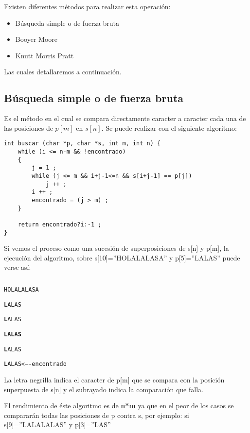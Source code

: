 Existen diferentes métodos para realizar esta operación:
\begin{itemize}
\item Búsqueda simple o de fuerza bruta
\item Booyer Moore
\item Knutt Morris Pratt
\end{itemize}
Las cuales detallaremos a continuación.

\subsection{Búsqueda simple o de fuerza bruta}
\label{sec:busqueda-simple-o}

Es el método en el cual se compara directamente caracter a caracter
cada una de las posiciones de $p[m]$ en $s[n]$.  Se puede realizar con
el siguiente algoritmo:

\begin{verbatim}
int buscar (char *p, char *s, int m, int n) {
    while (i <= n-m && !encontrado)
    {          
        j = 1 ;
        while (j <= m && i+j-1<=n && s[i+j-1] == p[j])
            j ++ ;
        i ++ ;
        encontrado = (j > m) ;
    }

    return encontrado?i:-1 ;
}
\end{verbatim}

Si vemos el proceso como una sucesión de superposiciones de s[n] y
p[m], la ejecución del algoritmo, sobre s[10]=''HOLALALASA'' y
p[5]=''LALAS'' puede verse así:

\begin{verbatim}
\end{verbatim}

\begin{alltt}
  H O L A L A L A S A

  {\bf L} A L A S

  {\bf L} A L A S

  {\bf L A L A S}

  {\bf L} A L A S

  {\bf L} A L A S <---- encontrado
\end{alltt}

La letra negrilla indica el caracter de p[m] que se compara con la
posición superpuesta de s[n] y el subrayado indica la comparación que
falla.

El rendimiento de éste algoritmo es de \textbf{n*m} ya que en el peor
de los casos se compararán todas las posiciones de p contra s, por
ejemplo: si s[9]=''LALALALAS'' y p[3]=''LAS''

